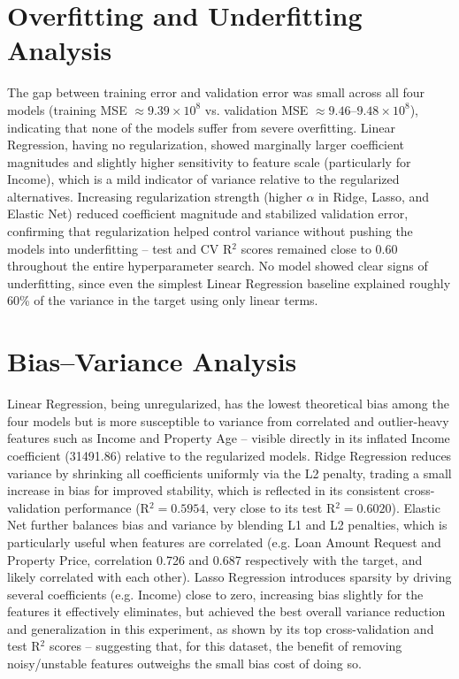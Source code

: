 \documentclass[12pt,a4paper]{article}
\begin{document}
\section{Overfitting and Underfitting Analysis}

The gap between training error and validation error was small across all four models (training MSE $\approx 9.39\times10^{8}$ vs. validation MSE $\approx 9.46$--$9.48\times10^{8}$), indicating that none of the models suffer from severe overfitting. Linear Regression, having no regularization, showed marginally larger coefficient magnitudes and slightly higher sensitivity to feature scale (particularly for Income), which is a mild indicator of variance relative to the regularized alternatives. Increasing regularization strength (higher $\alpha$ in Ridge, Lasso, and Elastic Net) reduced coefficient magnitude and stabilized validation error, confirming that regularization helped control variance without pushing the models into underfitting -- test and CV R$^2$ scores remained close to 0.60 throughout the entire hyperparameter search. No model showed clear signs of underfitting, since even the simplest Linear Regression baseline explained roughly 60\% of the variance in the target using only linear terms.

\section{Bias--Variance Analysis}

Linear Regression, being unregularized, has the lowest theoretical bias among the four models but is more susceptible to variance from correlated and outlier-heavy features such as Income and Property Age -- visible directly in its inflated Income coefficient (31491.86) relative to the regularized models. Ridge Regression reduces variance by shrinking all coefficients uniformly via the L2 penalty, trading a small increase in bias for improved stability, which is reflected in its consistent cross-validation performance (R$^2 = 0.5954$, very close to its test R$^2 = 0.6020$). Elastic Net further balances bias and variance by blending L1 and L2 penalties, which is particularly useful when features are correlated (e.g. Loan Amount Request and Property Price, correlation 0.726 and 0.687 respectively with the target, and likely correlated with each other). Lasso Regression introduces sparsity by driving several coefficients (e.g. Income) close to zero, increasing bias slightly for the features it effectively eliminates, but achieved the best overall variance reduction and generalization in this experiment, as shown by its top cross-validation and test R$^2$ scores -- suggesting that, for this dataset, the benefit of removing noisy/unstable features outweighs the small bias cost of doing so.
\end{document}
